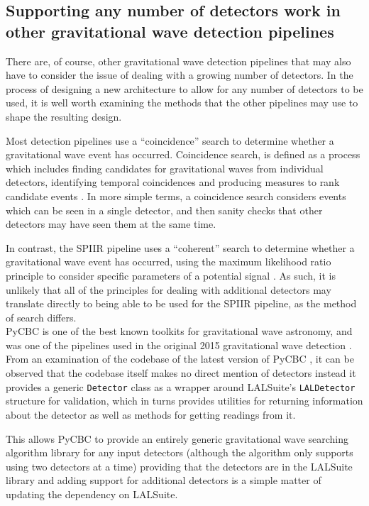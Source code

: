 \documentclass{article}
\begin{document}
\subsection{Supporting any number of detectors work in other gravitational wave detection pipelines} \label{sec:lit_review:pipelines}

There are, of course, other gravitational wave detection pipelines that may also have to consider the issue of dealing with a growing number of detectors.
In the process of designing a new architecture to allow for any number of detectors to be used, it is well worth examining the methods that the other pipelines may use to shape the resulting design.

Most detection pipelines use a ``coincidence'' search to determine whether a gravitational wave event has occurred.
Coincidence search, is defined as a process which includes finding candidates for gravitational waves from individual detectors, identifying temporal coincidences and producing measures to rank candidate events \cite[chapter 3]{ChuThesis}.
In more simple terms, a coincidence search considers events which can be seen in a single detector, and then sanity checks that other detectors may have seen them at the same time.

In contrast, the SPIIR pipeline uses a ``coherent'' search to determine whether a gravitational wave event has occurred, using the maximum likelihood ratio principle to consider specific parameters of a potential signal \cite[chapter 4]{ChuThesis}.
As such, it is unlikely that all of the principles for dealing with additional detectors may translate directly to being able to be used for the SPIIR pipeline, as the method of search differs.
\\

PyCBC is one of the best known toolkits for gravitational wave astronomy, and was one of the pipelines used in the original 2015 gravitational wave detection \cite{pycbc_home}.
From an examination of the codebase of the latest version of PyCBC \cite[October 2020]{pycbc}, it can be observed that the codebase itself makes no direct mention of detectors \textemdash{} instead it provides a generic \texttt{Detector} class as a wrapper around LALSuite's \cite{lalsuite} \texttt{LALDetector} structure for validation, which in turns provides utilities for returning information about the detector as well as methods for getting readings from it.

This allows PyCBC to provide an entirely generic gravitational wave searching algorithm library for any input detectors (although the algorithm only supports using two detectors at a time) providing that the detectors are in the LALSuite library \textemdash{} and adding support for additional detectors is a simple matter of updating the dependency on LALSuite.
\end{document}
